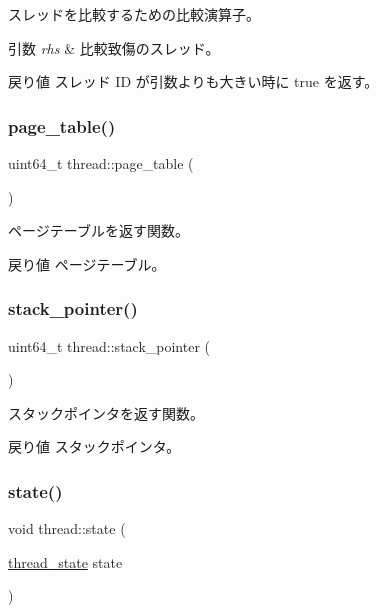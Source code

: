 スレッドを比較するための比較演算子。 
\begin{DoxyParams}{引数}
{\em rhs} & 比較致傷のスレッド。 \\
\hline
\end{DoxyParams}
\begin{DoxyReturn}{戻り値}
スレッド ID が引数よりも大きい時に true を返す。 
\end{DoxyReturn}
\hypertarget{classthread_a2c10391e5b23ac4ff0ff99765bd5728d}{}\label{classthread_a2c10391e5b23ac4ff0ff99765bd5728d} 
\subsubsection{\texorpdfstring{page\+\_\+table()}{page\_table()}}
{\footnotesize\ttfamily uint64\+\_\+t thread\+::page\+\_\+table (\begin{DoxyParamCaption}{ }\end{DoxyParamCaption})}

ページテーブルを返す関数。 \begin{DoxyReturn}{戻り値}
ページテーブル。 
\end{DoxyReturn}
\hypertarget{classthread_a813caa9cffcc7c21008e62235de71b54}{}\label{classthread_a813caa9cffcc7c21008e62235de71b54} 
\subsubsection{\texorpdfstring{stack\+\_\+pointer()}{stack\_pointer()}}
{\footnotesize\ttfamily uint64\+\_\+t thread\+::stack\+\_\+pointer (\begin{DoxyParamCaption}{ }\end{DoxyParamCaption})}

スタックポインタを返す関数。 \begin{DoxyReturn}{戻り値}
スタックポインタ。 
\end{DoxyReturn}
\hypertarget{classthread_a75bf27fd88692ce8a30ca04e3c397681}{}\label{classthread_a75bf27fd88692ce8a30ca04e3c397681} 
\subsubsection{\texorpdfstring{state()}{state()}\hspace{0.1cm}{\footnotesize\ttfamily [1/2]}}
{\footnotesize\ttfamily void thread\+::state (\begin{DoxyParamCaption}\item[{\hyperlink{thread_8h_a4b1b32c1fc744438f665f0f1932dd207}{thread\+\_\+state}}]{state }\end{DoxyParamCaption})}


